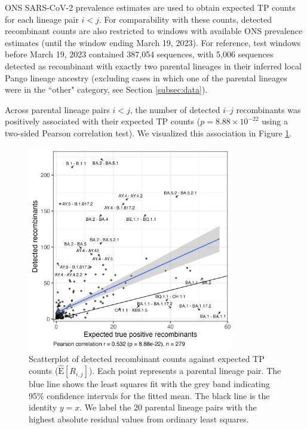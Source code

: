 \documentclass[11pt,oneside,letterpaper]{article}
\begin{document}
ONS SARS-CoV-2 prevalence estimates are used to obtain expected TP counts for each lineage pair $i<j$. For comparability with these counts, detected recombinant counts are also restricted to windows with available ONS prevalence estimates (until the window ending March 19, 2023). For reference, test windows before March 19, 2023 contained 387,054 sequences, with 5,006 sequences detected as recombinant with exactly two parental lineages in their inferred local Pango lineage ancestry (excluding cases in which one of the parental lineages were in the ``other" category, see Section \ref{subsec:data}). 


Across parental lineage pairs $i<j$, the number of detected $i\text{--}j$ recombinants was positively associated with their expected TP counts ($p = 8.88 \times 10^{-22}$ using a two-sided Pearson correlation test). We visualized this association in Figure \ref{fig:scatter2}. 

\begin{figure}[H]
\centering
\includegraphics[width=0.8\textwidth]{figures/hmm/pairs_scatter_detected_vs_expected.png}
\caption[Scatter2]{Scatterplot of detected recombinant counts against expected TP counts ($\hat{\mathrm{E}}[R_{i,j}]$). Each point represents a parental lineage pair. The blue line shows the least squares fit with the grey band indicating 95\% confidence intervals for the fitted mean. The black line is the identity $y = x$. We label the 20 parental lineage pairs with the highest absolute residual values from ordinary least squares.}
\label{fig:scatter2}
\end{figure}
\end{document}
